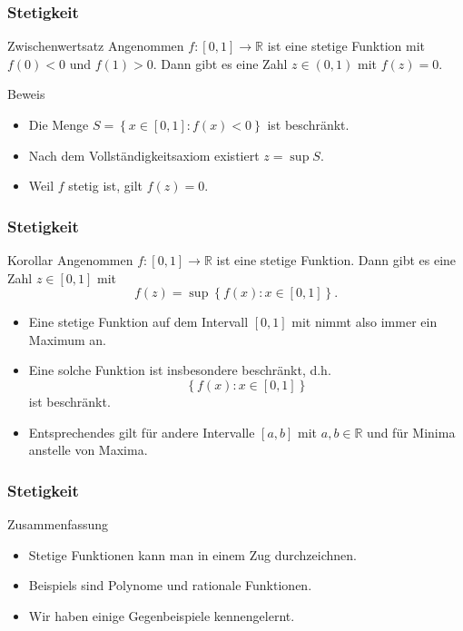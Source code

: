 \documentclass{beamer}
\newcommand\RR{\mathbb R}
\newcommand\cbc[1]{\left\{{#1}\right\}}
\renewcommand{\ae}{\"a}
\newcommand{\ue}{\"u}
\newcommand{\mytitle}{Stetigkeit}
\begin{document}
\begin{frame}\frametitle{\mytitle}
	\begin{block}{Zwischenwertsatz}
		Angenommen $f:[0,1]\to\RR$ ist eine stetige Funktion mit $f(0)<0$ und $f(1)>0$.
		Dann gibt es eine Zahl $z\in(0,1)$ mit $f(z)=0$.
	\end{block}
	\begin{block}{Beweis}
	\begin{itemize}
	\item Die Menge $S=\cbc{x\in[0,1]:f(x)<0}$ ist beschr\ae nkt.
	\item Nach dem Vollst\ae ndigkeitsaxiom existiert $z=\sup S$.
	\item Weil $f$ stetig ist, gilt $f(z)=0$.
	\end{itemize}
	\end{block}
\end{frame}

\begin{frame}\frametitle{\mytitle}
	\begin{block}{Korollar}
		Angenommen $f:[0,1]\to\RR$ ist eine stetige Funktion.
		Dann gibt es eine Zahl $z\in[0,1]$ mit $$f(z)=\sup\cbc{f(x):x\in[0,1]}.$$
	\end{block}
	\begin{block}{}
	\begin{itemize}
	\item Eine stetige Funktion auf dem Intervall $[0,1]$ mit nimmt also immer ein Maximum an.
	\item Eine solche Funktion ist insbesondere beschr\ae nkt, d.h.\
		$$\cbc{f(x):x\in[0,1]}$$
		ist beschr\ae nkt.
	\item Entsprechendes gilt f\ue r andere Intervalle $[a,b]$ mit $a,b\in\RR$ und f\ue r Minima anstelle von Maxima.
	\end{itemize}
	\end{block}
\end{frame}

\begin{frame}\frametitle{\mytitle}
	\begin{block}{Zusammenfassung}
	\begin{itemize}
		\item Stetige Funktionen kann man in einem Zug durchzeichnen.
		\item Beispiels sind Polynome und rationale Funktionen.
		\item Wir haben einige Gegenbeispiele kennengelernt.
	\end{itemize}	
	\end{block}
\end{frame}
\end{document}
